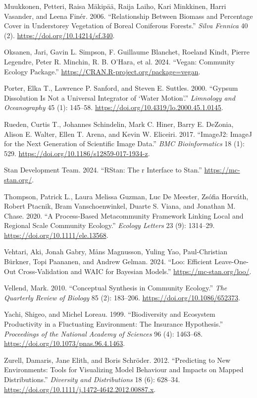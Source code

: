 \documentclass[
  letterpaper,
  DIV=11,
  numbers=noendperiod]{scrartcl}
\newlength{\cslhangindent}
\newenvironment{CSLReferences}[2] %
 {\begin{list}{}{%
  \setlength{\itemindent}{0pt}
  \setlength{\leftmargin}{0pt}
  \setlength{\parsep}{0pt}
  \ifodd #1
   \setlength{\leftmargin}{\cslhangindent}
   \setlength{\itemindent}{-1\cslhangindent}
  \fi
  \setlength{\itemsep}{#2\baselineskip}}}
 {\end{list}}
\begin{document}
\begin{CSLReferences}{1}{0}
Muukkonen, Petteri, Raisa Mäkipää, Raija Laiho, Kari Minkkinen, Harri
Vasander, and Leena Finér. 2006. {``Relationship Between Biomass and
Percentage Cover in Understorey Vegetation of Boreal Coniferous
Forests.''} \emph{Silva Fennica} 40 (2).
\url{https://doi.org/10.14214/sf.340}.

Oksanen, Jari, Gavin L. Simpson, F. Guillaume Blanchet, Roeland Kindt,
Pierre Legendre, Peter R. Minchin, R. B. O'Hara, et al. 2024. {``Vegan:
Community Ecology Package.''}
\url{https://CRAN.R-project.org/package=vegan}.

Porter, Elka T., Lawrence P. Sanford, and Steven E. Suttles. 2000.
{``Gypsum Dissolution Is Not a Universal Integrator of {`}Water
Motion{'}.''} \emph{Limnology and Oceanography} 45 (1): 145--58.
\url{https://doi.org/10.4319/lo.2000.45.1.0145}.

Rueden, Curtis T., Johannes Schindelin, Mark C. Hiner, Barry E. DeZonia,
Alison E. Walter, Ellen T. Arena, and Kevin W. Eliceiri. 2017.
{``ImageJ2: ImageJ for the Next Generation of Scientific Image Data.''}
\emph{BMC Bioinformatics} 18 (1): 529.
\url{https://doi.org/10.1186/s12859-017-1934-z}.

Stan Development Team. 2024. {``{\textbraceleft}RStan{\textbraceright}:
The {\textbraceleft}r{\textbraceright} Interface to
{\textbraceleft}Stan{\textbraceright}.''} \url{https://mc-stan.org/}.

Thompson, Patrick L., Laura Melissa Guzman, Luc De Meester, Zsófia
Horváth, Robert Ptacnik, Bram Vanschoenwinkel, Duarte S. Viana, and
Jonathan M. Chase. 2020. {``A Process-Based Metacommunity Framework
Linking Local and Regional Scale Community Ecology.''} \emph{Ecology
Letters} 23 (9): 1314--29. \url{https://doi.org/10.1111/ele.13568}.

Vehtari, Aki, Jonah Gabry, Måns Magnusson, Yuling Yao, Paul-Christian
Bürkner, Topi Paananen, and Andrew Gelman. 2024. {``Loo: Efficient
Leave-One-Out Cross-Validation and WAIC for Bayesian Models.''}
\url{https://mc-stan.org/loo/}.

Vellend, Mark. 2010. {``Conceptual Synthesis in Community Ecology.''}
\emph{The Quarterly Review of Biology} 85 (2): 183--206.
\url{https://doi.org/10.1086/652373}.

Yachi, Shigeo, and Michel Loreau. 1999. {``Biodiversity and Ecosystem
Productivity in a Fluctuating Environment: The Insurance Hypothesis.''}
\emph{Proceedings of the National Academy of Sciences} 96 (4): 1463--68.
\url{https://doi.org/10.1073/pnas.96.4.1463}.

Zurell, Damaris, Jane Elith, and Boris Schröder. 2012. {``Predicting to
New Environments: Tools for Visualizing Model Behaviour and Impacts on
Mapped Distributions.''} \emph{Diversity and Distributions} 18 (6):
628--34. \url{https://doi.org/10.1111/j.1472-4642.2012.00887.x}.

\end{CSLReferences}
\end{document}
